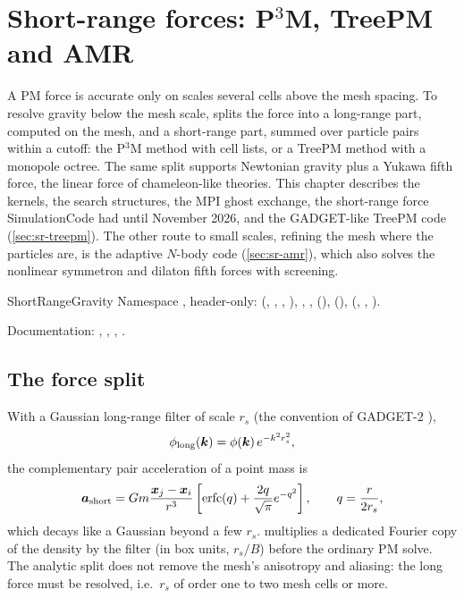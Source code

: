 \chapter{Short-range forces: P$^3$M, TreePM and AMR}\label{ch:short-range}

A PM force is accurate only on scales several cells above the mesh spacing. To resolve gravity below the mesh scale,
\fml{} splits the force into a long-range part, computed on the mesh, and a short-range part, summed over particle
pairs within a cutoff: the P$^3$M method with cell lists, or a TreePM method with a monopole octree. The same split
supports Newtonian gravity plus a Yukawa fifth force, the linear force of chameleon-like theories. This chapter
describes the kernels, the search structures, the MPI ghost exchange, the short-range force SimulationCode had until
November 2026, and the GADGET-like TreePM code  (\cref{sec:sr-treepm}). The other route to small scales, refining the mesh
where the particles are, is the adaptive $N$-body code  (\cref{sec:sr-amr}), which also solves the
nonlinear symmetron and dilaton fifth forces with screening.

\begin{modulebox}{ShortRangeGravity}
Namespace , header-only:  (, ,
, ), , ,  (),
 (),  (,
, ).\par
Documentation: , ,
, .
\end{modulebox}

\section{The force split}\label{sec:sr-split}

With a Gaussian long-range filter of scale $r_s$ (the convention of GADGET-2 \cite{Springel2005}),
\begin{equation}
\phi_{\rm long}(\bm{k})=\phi(\bm{k})\,e^{-k^2r_s^2},
\end{equation}
the complementary pair acceleration of a point mass is
\begin{equation}
\bm a_{\rm short}=Gm\frac{\bm{x}_j-\bm{x}_i}{r^3}\left[\mathrm{erfc}(q)+\frac{2q}{\sqrt\pi}e^{-q^2}\right],\qquad q=\frac{r}{2r_s},
\end{equation}
which decays like a Gaussian beyond a few $r_s$.  multiplies a dedicated Fourier copy of
the density by the filter (in box units, $r_s/B$) before the ordinary PM solve. The analytic split does not remove the
mesh's anisotropy and aliasing: the long force must be resolved, i.e.\ $r_s$ of order one to two mesh cells or more.

